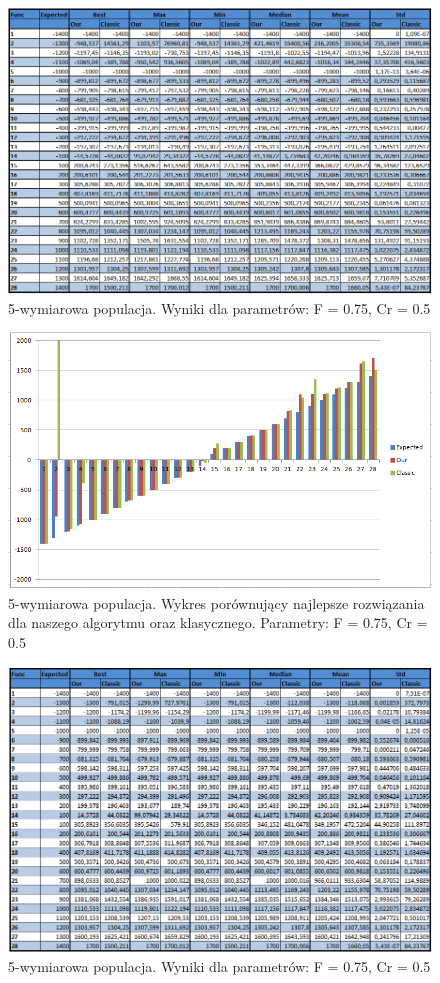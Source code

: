\documentclass[a4paper]{article}
\begin{document}
\begin{figure}
\centering
\includegraphics[width=\textwidth]{F75Cr5L5tab.png}
\caption{5-wymiarowa populacja. Wyniki dla parametrów: F = 0.75, Cr = 0.5}
\end{figure}

\begin{figure}
\centering
\includegraphics[width=\textwidth]{F75Cr5L5chart.png}
\caption{5-wymiarowa populacja. Wykres porównujący najlepsze rozwiązania dla naszego algorytmu oraz klasycznego. Parametry: F = 0.75, Cr = 0.5}
\end{figure}

\begin{figure}
\centering
\includegraphics[width=\textwidth]{F75Cr75L5tab.png}
\caption{5-wymiarowa populacja. Wyniki dla parametrów: F = 0.75, Cr = 0.5}
\end{figure}
\end{document}

